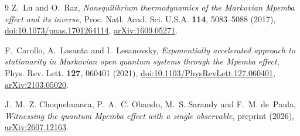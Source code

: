 \documentclass[11pt,a4paper]{article}
\theoremstyle{definition}
\theoremstyle{plain}
\begin{document}
\begin{thebibliography}{9}
Z.~Lu and O.~Raz,
\emph{Nonequilibrium thermodynamics of the Markovian Mpemba effect and its
inverse},
Proc. Natl. Acad. Sci. U.S.A. \textbf{114}, 5083--5088 (2017),
\href{https://doi.org/10.1073/pnas.1701264114}{doi:10.1073/pnas.1701264114},
\href{https://arxiv.org/abs/1609.05271}{arXiv:1609.05271}.

F.~Carollo, A.~Lasanta and I.~Lesanovsky,
\emph{Exponentially accelerated approach to stationarity in Markovian open
quantum systems through the Mpemba effect},
Phys. Rev. Lett. \textbf{127}, 060401 (2021),
\href{https://doi.org/10.1103/PhysRevLett.127.060401}{doi:10.1103/PhysRevLett.127.060401},
\href{https://arxiv.org/abs/2103.05020}{arXiv:2103.05020}.

J.~M.~Z. Choquehuanca, P.~A.~C. Obando, M.~S. Sarandy and F.~M. de~Paula,
\emph{Witnessing the quantum Mpemba effect with a single observable},
preprint (2026),
\href{https://arxiv.org/abs/2607.12163}{arXiv:2607.12163}.

\end{thebibliography}
\end{document}
